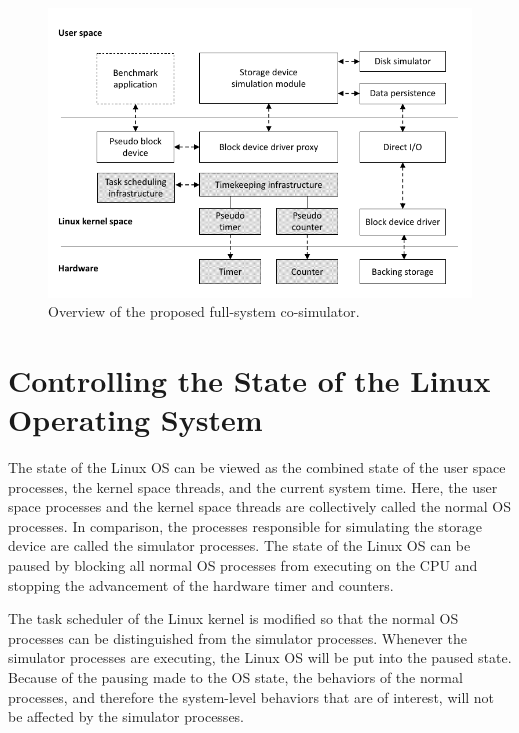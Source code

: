 \begin{figure}[htpb]
	\centering
	\includegraphics[width=1\textwidth]{figures/ch5-full-system-simulator.pdf}
	\caption{\label{fig:ch5-full-system-simulator}Overview of the proposed full-system co-simulator.}
\end{figure}

\section{Controlling the State of the Linux Operating System}
\label{sec:managing-linux-OS-state}

The state of the Linux OS can be viewed as the combined state of the user space processes, the kernel space threads, and the current system time. Here, the user space processes and the kernel space threads are collectively called the normal OS processes. In comparison, the processes responsible for simulating the storage device are called the simulator processes. The state of the Linux OS can be paused by blocking all normal OS processes from executing on the CPU and stopping the advancement of the hardware timer and counters.

The task scheduler of the Linux kernel is modified so that the normal OS processes can be distinguished from the simulator processes. Whenever the simulator processes are executing, the Linux OS will be put into the paused state. Because of the pausing made to the OS state, the behaviors of the normal processes, and therefore the system-level behaviors that are of interest, will not be affected by the simulator processes.

